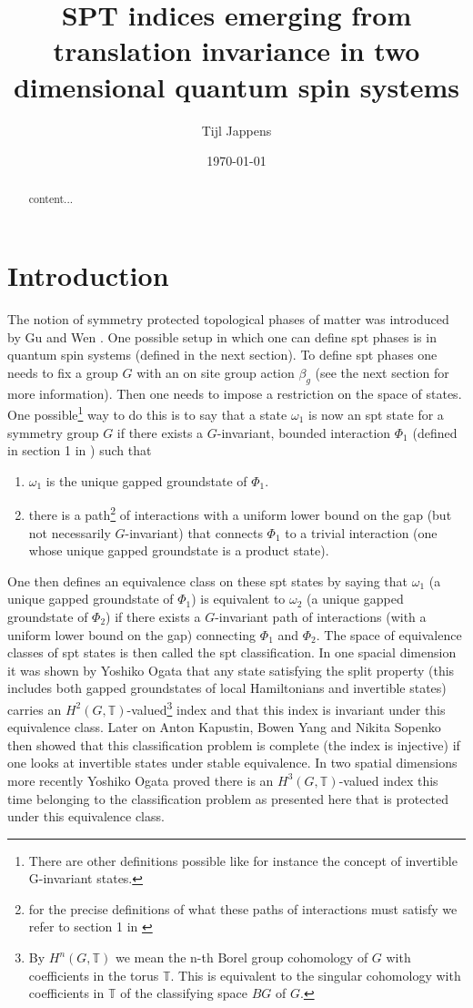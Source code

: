 \documentclass[12pt,a4paper,twoside]{article}
\title{SPT indices emerging from translation invariance in two dimensional quantum spin systems}
\author{Tijl Jappens}
\date{\today}
\newcommand{\TT}{\mathbb T}
\theoremstyle{definition}
\numberwithin{equation}{section}
\begin{document}
\maketitle	
\begin{abstract}
	content...
\end{abstract}
\section{Introduction}
The notion of symmetry protected topological phases of matter was introduced by Gu and Wen \cite{Chen_2013}. One possible setup in which one can define spt phases is in quantum spin systems (defined in the next section). To define spt phases one needs to fix a group $G$ with an on site group action $\beta_g$ (see the next section for more information). Then one needs to impose a restriction on the space of states. One possible\footnote{There are other definitions possible like for instance the concept of invertible G-invariant states.} way to do this is to say that a state $\omega_1$ is now an spt state for a symmetry group $G$ if there exists a $G$-invariant, bounded interaction $\Phi_1$ (defined in section 1 in \cite{ogata2021h3gmathbb}) such that
\begin{enumerate}
	\item $\omega_1$ is the unique gapped groundstate of $\Phi_1$.
	\item there is a path\footnote{for the precise definitions of what these paths of interactions must satisfy we refer to section 1 in \cite{ogata2021h3gmathbb}} of interactions with a uniform lower bound on the gap (but not necessarily $G$-invariant) that connects $\Phi_1$ to a trivial interaction (one whose unique gapped groundstate is a product state).
\end{enumerate}
One then defines an equivalence class on these spt states by saying that $\omega_1$ (a unique gapped groundstate of $\Phi_1$) is equivalent to $\omega_2$ (a unique gapped groundstate of $\Phi_2$) if there exists a $G$-invariant path of interactions (with a uniform lower bound on the gap) connecting $\Phi_1$ and $\Phi_2$. The space of equivalence classes of spt states is then called the spt classification. In one spacial dimension it was shown by Yoshiko Ogata \cite{ogata2019classification} that any state satisfying the split property (this includes both gapped groundstates of local Hamiltonians and invertible states) carries an $H^2(G,\TT)$-valued\footnote{By $H^n(G,\TT)$ we mean the n-th Borel group cohomology of $G$ with coefficients in the torus $\TT$. This is equivalent to the singular cohomology with coefficients in $\TT$ of the classifying space $BG$ of $G$.} index and that this index is invariant under this equivalence class. Later on Anton Kapustin, Bowen Yang and Nikita Sopenko \cite{kapustin2021classification} then showed that this classification problem is complete (the index is injective) if one looks at invertible states under stable equivalence. In two spatial dimensions more recently Yoshiko Ogata \cite{ogata2021h3gmathbb} proved there is an $H^3(G,\TT)$-valued index this time belonging to the classification problem as presented here that is protected under this equivalence class.
\end{document}
